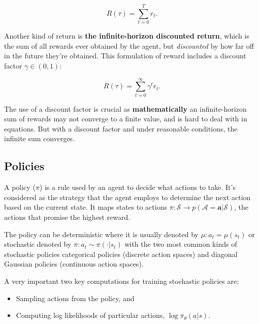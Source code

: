 \begin{center}
	\begin{equation} \label{eq:1}
		R(\tau)=\sum_{t=0}^{T} r_{t}.
	\end{equation}
\end{center}

Another kind of return is \textbf{the infinite-horizon discounted return}, which is the sum of all rewards ever obtained by the agent, but \textit{discounted} by how far off in the future they’re obtained. This formulation of reward includes a discount factor \(\gamma \in(0,1)\):

\begin{center}
	\begin{equation} \label{eq:2}
		R(\tau)=\sum_{t=0}^{\infty} \gamma^{t} r_{t}.
	\end{equation}
\end{center}

The use of a discount factor is crucial as \textbf{mathematically} an infinite-horizon sum of rewards may not converge to a finite value, and is hard to deal with in equations. But with a discount factor and under reasonable conditions, the infinite sum converges.

\subsection{Policies}

A policy ($\pi$) is a rule used by an agent to decide what actions to take. It's considered as the strategy that the agent employs to determine the next action based on the current state. It maps states to actions $ \pi : \mathcal{S} \rightarrow p(\mathcal{A}=\mathbf{a} | \mathcal{S}) $, the actions that promise the highest reward.

The policy can be deterministic where it is usually denoted by $ \mu: a_{t}=\mu\left(s_{t}\right) $ or stochastic denoted by $ \pi:  a_{t} \sim \pi\left(\cdot | s_{t}\right) $
with the two most common kinds of stochastic policies categorical policies (discrete action spaces) and diagonal Gaussian policies (continuous action spaces).

A very important two key computations for training stochastic policies are:
\begin{itemize}
	\item Sampling actions from the policy, and
	\item Computing log likelihoods of particular actions, $ \log \pi_{\theta}(a|s) $.
\end{itemize}


